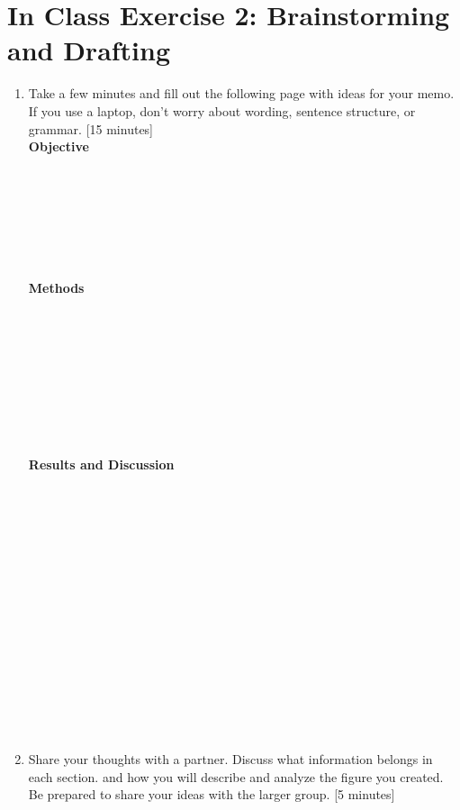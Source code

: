 \documentclass[12pt,letterpaper]{article}
\begin{document}
\section *{In Class Exercise 2: Brainstorming and Drafting}
\begin{enumerate}
\item Take a few minutes and fill out the following page with ideas for your memo.  If you use a laptop, don't worry about wording, sentence structure, or grammar. [15 minutes]\\ 

\textbf{Objective}\\\\\\\\\\\\\\\\

\textbf{Methods}\\\\\\\\\\\\\\\\\\\\

\textbf{Results and Discussion}\\\\\\\\\\\\\\\\\\\\\\\\\\\\\\\\

\item Share your thoughts with a partner.  Discuss what information belongs in each section. and how you will describe and analyze the figure you created.  Be prepared to share your ideas with the larger group. [5 minutes]
\end{enumerate}
\end{document}

